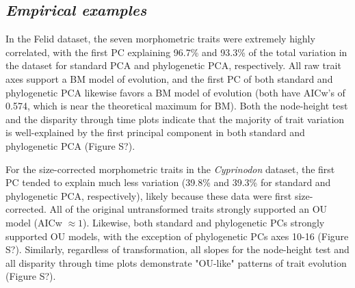 \documentclass[a4paper,12pt]{article}
\begin{document}
\subsection{\emph{Empirical examples}}
In the Felid dataset, the seven morphometric traits were extremely highly correlated, with the first PC explaining 96.7\% and 93.3\% of the total variation in the dataset for standard PCA and phylogenetic PCA, respectively. All raw trait axes support a BM model of evolution, and the first PC of both standard and phylogenetic PCA likewise favors a BM model of evolution (both have AICw's of 0.574, which is near the theoretical maximum for BM). Both the node-height test and the disparity through time plots indicate that the majority of trait variation is well-explained by the first principal component in both standard and phylogenetic PCA (Figure S?). 

For the size-corrected morphometric traits in the \textit{Cyprinodon} dataset, the first PC tended to explain much less variation (39.8\% and 39.3\% for standard and phylogenetic PCA, respectively), likely because these data were first size-corrected. All of the original untransformed traits strongly supported an OU model (AICw $\approx 1$). Likewise, both standard and phylogenetic PCs strongly supported OU models, with the exception of phylogenetic PCs axes 10-16 (Figure S?). Similarly, regardless of transformation, all slopes for the node-height test and all disparity through time plots demonstrate "OU-like" patterns of trait evolution (Figure S?). 

\end{document}
